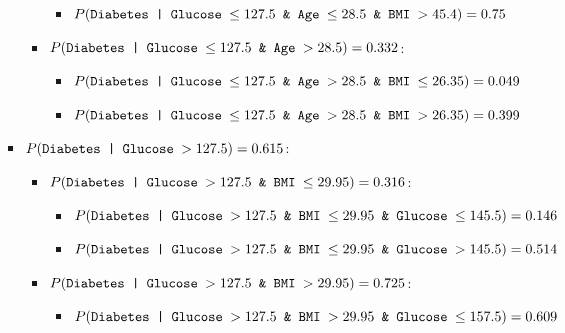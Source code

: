 \documentclass[12pt]{article}
\begin{document}
\begin{enumerate}[leftmargin=\labelsep, label=\textbf{\arabic*.)}]
\begin{enumerate}[label=\textbf{\roman*.)}]
\begin{itemize}
\begin{itemize}
\begin{itemize}
                                            \item $P( \text{\texttt{Diabetes | Glucose $\leq 127.5$ \& Age $\leq 28.5$ \& BMI $> 45.4$}}) = 0.75$
                                        \end{itemize}
                                  \item $P( \text{\texttt{Diabetes | Glucose $\leq 127.5$ \& Age $> 28.5$}}) = 0.332$:
                                        \begin{itemize}
                                            \item $P( \text{\texttt{Diabetes | Glucose $\leq 127.5$ \& Age $> 28.5$ \& BMI $\leq 26.35$}}) = 0.049$
                                            \item $P( \text{\texttt{Diabetes | Glucose $\leq 127.5$ \& Age $> 28.5$ \& BMI $> 26.35$}}) = 0.399$
                                        \end{itemize}
                              \end{itemize}
                    \end{itemize}
                    \begin{itemize}
                        \item $P( \text{\texttt{Diabetes | Glucose $> 127.5$}}) = 0.615$:
                              \begin{itemize}
                                  \item $P( \text{\texttt{Diabetes | Glucose $> 127.5$ \& BMI $\leq 29.95$}}) = 0.316$:
                                        \begin{itemize}
                                            \item $P( \text{\texttt{Diabetes | Glucose $> 127.5$ \& BMI $\leq 29.95$ \& Glucose $\leq 145.5$}}) = 0.146$
                                            \item $P( \text{\texttt{Diabetes | Glucose $> 127.5$ \& BMI $\leq 29.95$ \& Glucose $> 145.5$}}) = 0.514$
                                        \end{itemize}
                                  \item $P( \text{\texttt{Diabetes | Glucose $> 127.5$ \& BMI $> 29.95$}}) = 0.725$:
                                        \begin{itemize}
                                            \item $P( \text{\texttt{Diabetes | Glucose $> 127.5$ \& BMI $> 29.95$ \& Glucose $\leq 157.5$}}) = 0.609$

\end{itemize}
\end{itemize}
\end{itemize}
\end{enumerate}
\end{enumerate}
\end{document}
